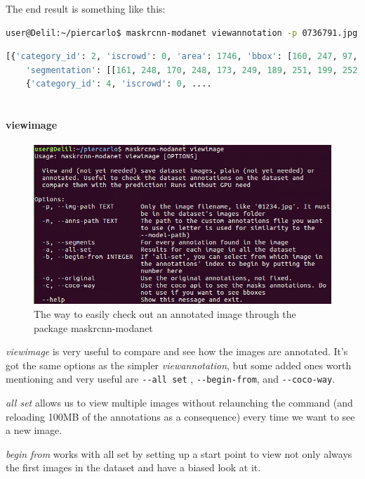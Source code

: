 The end result is something like this:

\begin{lstlisting}[language=bash]
user@Delil:~/piercarlo$ maskrcnn-modanet viewannotation -p 0736791.jpg -o
\end{lstlisting}

\begin{lstlisting}[language=Python]
	[{'category_id': 2, 'iscrowd': 0, 'area': 1746, 'bbox': [160, 247, 97, 18], 'id': 0, 
	'segmentation': [[161, 248, 170, 248, 173, 249, 189, 251, 199, 252, 199, 250,...]], 'image_id': 736791}, 
	{'category_id': 4, 'iscrowd': 0, ....
	
\end{lstlisting}

\paragraph{viewimage}

\begin{figure}[H]
	\centering
	\includegraphics[width=.75\linewidth]{figures/cli/viewimage}
	\caption{The way to easily check out an annotated image through the package maskrcnn-modanet}
	\label{f:cli-viewimage}
\end{figure}

\emph{viewimage} is very useful to compare and see how the images are annotated. 
It's got the same options as the simpler \emph{viewannotation}, but some added ones worth mentioning and very useful are \lstinline[language=bash]|--all set| , \lstinline[language=bash]|--begin-from|, and \lstinline[language=bash]|--coco-way|.

\emph{all set} allows us to view multiple images without relaunching the command (and reloading 100MB of the annotations as a consequence) every time we want to see a new image.

\emph{begin from} works with all set by setting up a start point to view not only always the first images in the dataset and have a biased look at it.

